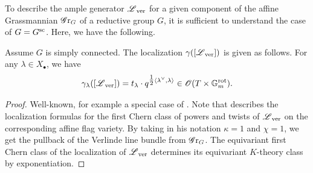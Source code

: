To describe the ample generator $\eL_{\ver}$ for a given component of the affine Grassmannian $\Gr_G$ of a reductive group $G$, it is sufficient to understand the case of $G=G^{\sc}$. Here, we have the following.
\begin{lemma}\label{lemma: localization of the verlinde line bundle}
Assume $G$ is simply connected.
The localization $\loc ([\eL_{\ver}])$ is given as follows. For any $\lambda \in X_{\bullet}$, we have
\begin{equation*}
    \loc_{\lambda} ([\eL_{\ver}]) = t_{\lambda} \cdot q^{\tfrac{1}{2} \langle \lambda^{\vee}, \lambda \rangle} \in \O(T \times \Gm^{\rot}).
\end{equation*}
\end{lemma}
\begin{proof}
Well-known, for example a special case of \cite[Proposition 7.6]{Yun10}. Note that \cite{Yun10} describes the localization formulas for the first Chern class of powers and twists of $\eL_{\ver}$ on the corresponding affine flag variety. By taking in his notation $\kappa=1$ and $\chi=1$, we get the pullback of the Verlinde line bundle from $\Gr_G$. The equivariant first Chern class of the localization of $\eL_{\ver}$ determines its equivariant $K$-theory class by exponentiation.
\end{proof}    





